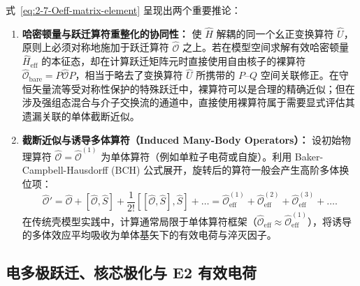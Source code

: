 式~\eqref{eq:2-7-Oeff-matrix-element} 呈现出两个重要推论：
\begin{enumerate}
\item \textbf{哈密顿量与跃迁算符重整化的协同性：}
使 $\hat{H}$ 解耦的同一个幺正变换算符 $\hat{U}$，原则上必须对称地施加于跃迁算符 $\hat{\mathcal{O}}$ 之上。若在模型空间求解有效哈密顿量 $\hat{H}_{\mathrm{eff}}$ 的本征态，却在计算跃迁矩阵元时直接使用自由核子的裸算符 $\hat{\mathcal{O}}_{\mathrm{bare}} = P \hat{\mathcal{O}} P$，相当于略去了变换算符 $\hat{U}$ 所携带的 $P\text{--}Q$ 空间关联修正。在守恒矢量流等受对称性保护的特殊跃迁中，裸算符可以是合理的精确近似；但在涉及强组态混合与介子交换流的通道中，直接使用裸算符属于需要显式评估其遗漏关联的单体截断近似。
\item \textbf{截断近似与诱导多体算符（Induced Many-Body Operators）：}
设初始物理算符 $\hat{\mathcal{O}} = \hat{\mathcal{O}}^{(1)}$ 为单体算符（例如单粒子电荷或自旋）。利用 Baker-Campbell-Hausdorff (BCH) 公式展开，旋转后的算符一般会产生高阶多体换位项：
\begin{equation}\label{eq:2-7-BCH-expansion}
\hat{\mathcal{O}}' = \hat{\mathcal{O}} + [\hat{\mathcal{O}}, \hat{S}] + \frac{1}{2!} [[\hat{\mathcal{O}}, \hat{S}], \hat{S}] + \dots = \hat{\mathcal{O}}^{(1)}_{\mathrm{eff}} + \hat{\mathcal{O}}^{(2)}_{\mathrm{eff}} + \hat{\mathcal{O}}^{(3)}_{\mathrm{eff}} + \dots.
\end{equation}
在传统壳模型实践中，计算通常局限于单体算符框架（$\hat{\mathcal{O}}_{\mathrm{eff}} \approx \hat{\mathcal{O}}^{(1)}_{\mathrm{eff}}$），将诱导的多体效应平均吸收为单体基矢下的有效电荷与淬灭因子。
\end{enumerate}

\subsection{电多极跃迁、核芯极化与 E2 有效电荷}\label{sec:2-7-2}

